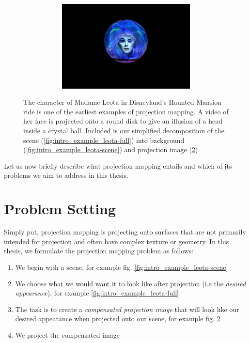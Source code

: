 \begin{figure}[ht]
\begin{subfigure}{0.39\textwidth}
        \begin{subfigure}{\textwidth}
            \centering
            \includegraphics[width=\textwidth]{images/01-Leota-only_head.jpg}
            \caption{}
            \label{fig:intro_example_leota-head}
        \end{subfigure}
    \end{subfigure}
    \caption{The character of Madame Leota in Disneyland's Haunted Mansion ride is one of the earliest examples of projection mapping. A video of her face is projected onto a round disk to give an illusion of a head inside a crystal ball. Included is our simplified decomposition of the scene (\ref{fig:intro_example_leota-full}) into background (\ref{fig:intro_example_leota-scene}) and projection image (\ref{fig:intro_example_leota-head})}
    \label{fig:intro_example_leota}
\end{figure}

Let us now briefly describe what projection mapping entails and which of its problems we aim to address in this thesis.

\section{Problem Setting}
\label{section:intro-problem_setting}

Simply put, projection mapping is projecting onto surfaces that are not primarily intended for projection and often have complex texture or geometry. In this thesis, we formulate the projection mapping problem as follows:

\begin{enumerate}
    \item We begin with a scene, for example fig. \ref{fig:intro_example_leota-scene}
    \item We choose what we would want it to look like after projection (i.e the \textit{desired appearance}), for example \ref{fig:intro_example_leota-full}
    \item The task is to create a \textit{compensated projection image} that will look like our desired appearance when projected onto our scene, for example fig. \ref{fig:intro_example_leota-head}
    \item We project the compensated image
\end{enumerate}

